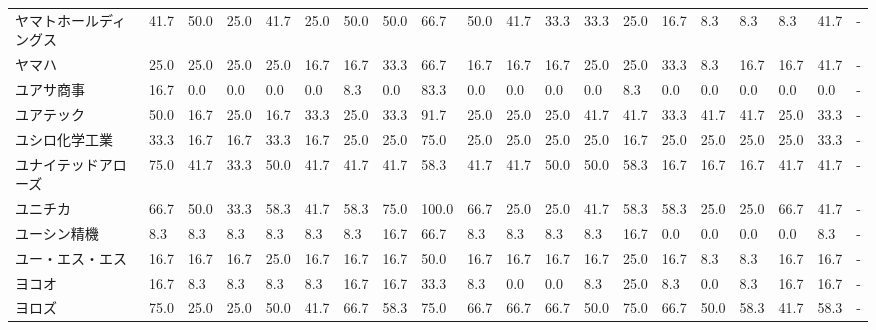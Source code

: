 \documentclass[a4paper，11pt]{jsarticle}
\begin{document}
\begin{longtable}[c]{lp{3mm}p{3mm}p{3mm}p{3mm}p{3mm}p{3mm}p{3mm}p{3mm}p{3mm}p{3mm}p{3mm}p{3mm}p{3mm}p{3mm}p{3mm}p{3mm}p{3mm}p{3mm}p{3mm}}
ヤマトホールディングス     &   41.7 &   50.0 &      25.0 &      41.7 &       25.0 &   50.0 &   50.0 &   66.7 &    50.0 &    41.7 &   33.3 &  33.3 &   25.0 &    16.7 &     8.3 &   8.3 &   8.3 &  41.7 &     - \\
ヤマハ             &   25.0 &   25.0 &      25.0 &      25.0 &       16.7 &   16.7 &   33.3 &   66.7 &    16.7 &    16.7 &   16.7 &  25.0 &   25.0 &    33.3 &     8.3 &  16.7 &  16.7 &  41.7 &     - \\
ユアサ商事           &   16.7 &    0.0 &       0.0 &       0.0 &        0.0 &    8.3 &    0.0 &   83.3 &     0.0 &     0.0 &    0.0 &   0.0 &    8.3 &     0.0 &     0.0 &   0.0 &   0.0 &   0.0 &     - \\
ユアテック           &   50.0 &   16.7 &      25.0 &      16.7 &       33.3 &   25.0 &   33.3 &   91.7 &    25.0 &    25.0 &   25.0 &  41.7 &   41.7 &    33.3 &    41.7 &  41.7 &  25.0 &  33.3 &     - \\
ユシロ化学工業         &   33.3 &   16.7 &      16.7 &      33.3 &       16.7 &   25.0 &   25.0 &   75.0 &    25.0 &    25.0 &   25.0 &  25.0 &   16.7 &    25.0 &    25.0 &  25.0 &  25.0 &  33.3 &     - \\
ユナイテッドアローズ      &   75.0 &   41.7 &      33.3 &      50.0 &       41.7 &   41.7 &   41.7 &   58.3 &    41.7 &    41.7 &   50.0 &  50.0 &   58.3 &    16.7 &    16.7 &  16.7 &  41.7 &  41.7 &     - \\
ユニチカ            &   66.7 &   50.0 &      33.3 &      58.3 &       41.7 &   58.3 &   75.0 &  100.0 &    66.7 &    25.0 &   25.0 &  41.7 &   58.3 &    58.3 &    25.0 &  25.0 &  66.7 &  41.7 &     - \\
ユーシン精機          &    8.3 &    8.3 &       8.3 &       8.3 &        8.3 &    8.3 &   16.7 &   66.7 &     8.3 &     8.3 &    8.3 &   8.3 &   16.7 &     0.0 &     0.0 &   0.0 &   0.0 &   8.3 &     - \\
ユー・エス・エス        &   16.7 &   16.7 &      16.7 &      25.0 &       16.7 &   16.7 &   16.7 &   50.0 &    16.7 &    16.7 &   16.7 &  16.7 &   25.0 &    16.7 &     8.3 &   8.3 &  16.7 &  16.7 &     - \\
ヨコオ             &   16.7 &    8.3 &       8.3 &       8.3 &        8.3 &   16.7 &   16.7 &   33.3 &     8.3 &     0.0 &    0.0 &   8.3 &   25.0 &     8.3 &     0.0 &   8.3 &  16.7 &  16.7 &     - \\
ヨロズ             &   75.0 &   25.0 &      25.0 &      50.0 &       41.7 &   66.7 &   58.3 &   75.0 &    66.7 &    66.7 &   66.7 &  50.0 &   75.0 &    66.7 &    50.0 &  58.3 &  41.7 &  58.3 &     - \\

\end{longtable}
\end{document}
